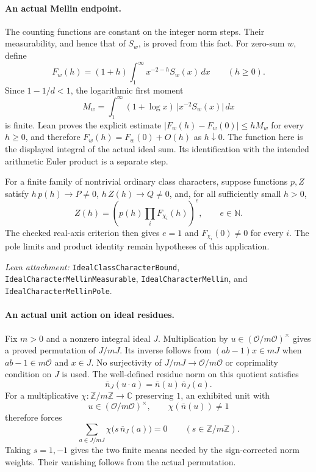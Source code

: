 \documentclass[11pt]{article}
\newcommand{\OO}{\mathcal O}
\newcommand{\ZZ}{\mathbb Z}
\newcommand{\CC}{\mathbb C}
\newcommand{\NN}{\mathbb N}
\newcommand{\absn}[1]{\lvert #1\rvert}
\begin{document}
\paragraph{An actual Mellin endpoint.}
The counting functions are constant on the integer norm steps. Their
measurability, and hence that of $S_w$, is proved from this fact.
For zero-sum $w$, define
\[
 F_w(h)=(1+h)\int_1^{\infty}x^{-2-h}S_w(x)\,dx
 \qquad(h\geq0).
\]
Since $1-1/d<1$, the logarithmic first moment
\[
 M_w=\int_1^{\infty}(1+\log x)\,\absn{x^{-2}S_w(x)}\,dx
\]
is finite. Lean proves the explicit estimate
$\absn{F_w(h)-F_w(0)}\leq hM_w$ for every $h\geq0$, and therefore
$F_w(h)=F_w(0)+O(h)$ as $h\downarrow0$.
The function here is the displayed integral of the actual ideal sum.
Its identification with the intended arithmetic Euler product is a separate step.

For a finite family of nontrivial ordinary class characters, suppose functions
$p,Z$ satisfy $h\,p(h)\to P\ne0$, $h\,Z(h)\to Q\ne0$, and, for all sufficiently
small $h>0$,
\[
 Z(h)=\left(p(h)\prod_i F_{\chi_i}(h)\right)^e,
 \qquad e\in\NN.
\]
The checked real-axis criterion then gives $e=1$ and
$F_{\chi_i}(0)\ne0$ for every $i$. The pole limits and product identity
remain hypotheses of this application.

\smallskip
\noindent\emph{Lean attachment:}
\texttt{IdealClassCharacterBound}, \texttt{IdealCharacterMellinMeasurable},
\texttt{IdealCharacterMellin}, and \texttt{IdealCharacterMellinPole}.

\newpage
\paragraph{An actual unit action on ideal residues.}
Fix $m>0$ and a nonzero integral ideal $J$.
Multiplication by $u\in(\OO/m\OO)^{\times}$ gives a proved permutation of
$J/mJ$. Its inverse follows from $(ab-1)x\in mJ$ when
$ab-1\in m\OO$ and $x\in J$. No surjectivity of
$J/mJ\to\OO/m\OO$ or coprimality condition on $J$ is used.
The well-defined residue norm on this quotient satisfies
\[
 \overline n_J(u\cdot a)=\overline n(u)\,\overline n_J(a).
\]
For a multiplicative $\chi:\ZZ/m\ZZ\to\CC$ preserving $1$, an exhibited
unit with
\begin{equation}\label{eq:unit-witness}
 u\in(\OO/m\OO)^{\times},\qquad \chi(\overline n(u))\ne1
\end{equation}
therefore forces
\[
 \sum_{a\in J/mJ}\chi\bigl(s\,\overline n_J(a)\bigr)=0
 \qquad(s\in\ZZ/m\ZZ).
\]
Taking $s=1,-1$ gives the two finite means needed by the sign-corrected
norm weights. Their vanishing follows from the actual permutation.
\end{document}
